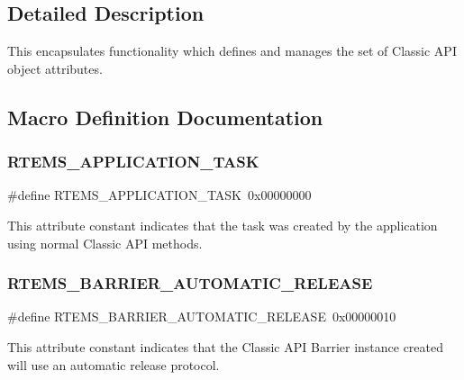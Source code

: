 \subsection{Detailed Description}
This encapsulates functionality which defines and manages the set of Classic A\+PI object attributes. 

\subsection{Macro Definition Documentation}
\mbox{\label{group__ClassicAttributes_gaac7b323892879f425f0ea7106cb99150}} 
\subsubsection{\texorpdfstring{RTEMS\_APPLICATION\_TASK}{RTEMS\_APPLICATION\_TASK}}
{\footnotesize\ttfamily \#define R\+T\+E\+M\+S\+\_\+\+A\+P\+P\+L\+I\+C\+A\+T\+I\+O\+N\+\_\+\+T\+A\+SK~0x00000000}

This attribute constant indicates that the task was created by the application using normal Classic A\+PI methods. \mbox{\label{group__ClassicAttributes_gacea692c6eef2c867363d0423bf8ba9ea}} 
\subsubsection{\texorpdfstring{RTEMS\_BARRIER\_AUTOMATIC\_RELEASE}{RTEMS\_BARRIER\_AUTOMATIC\_RELEASE}}
{\footnotesize\ttfamily \#define R\+T\+E\+M\+S\+\_\+\+B\+A\+R\+R\+I\+E\+R\+\_\+\+A\+U\+T\+O\+M\+A\+T\+I\+C\+\_\+\+R\+E\+L\+E\+A\+SE~0x00000010}

This attribute constant indicates that the Classic A\+PI Barrier instance created will use an automatic release protocol. \mbox{\label{group__ClassicAttributes_ga10fdb85c61e7cfe42a31387fbf7bd9f5}} 
